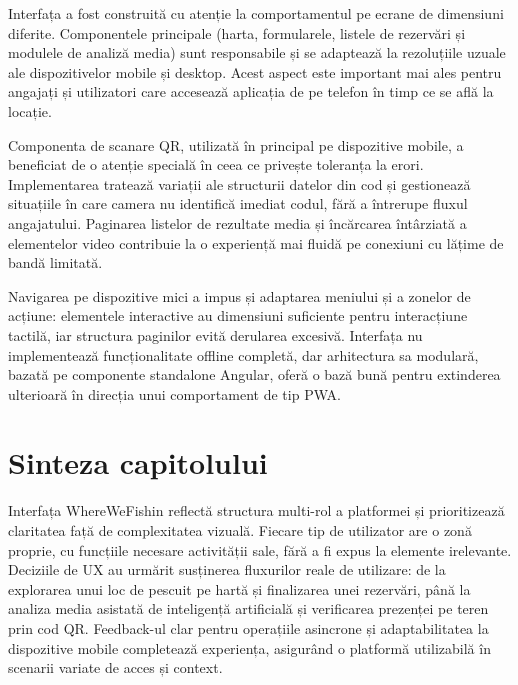 Interfața a fost construită cu atenție la comportamentul pe ecrane de dimensiuni diferite. Componentele principale (harta, formularele, listele de rezervări și modulele de analiză media) sunt responsabile și se adaptează la rezoluțiile uzuale ale dispozitivelor mobile și desktop. Acest aspect este important mai ales pentru angajați și utilizatori care accesează aplicația de pe telefon în timp ce se află la locație.

Componenta de scanare QR, utilizată în principal pe dispozitive mobile, a beneficiat de o atenție specială în ceea ce privește toleranța la erori. Implementarea tratează variații ale structurii datelor din cod și gestionează situațiile în care camera nu identifică imediat codul, fără a întrerupe fluxul angajatului. Paginarea listelor de rezultate media și încărcarea întârziată a elementelor video contribuie la o experiență mai fluidă pe conexiuni cu lățime de bandă limitată.

Navigarea pe dispozitive mici a impus și adaptarea meniului și a zonelor de acțiune: elementele interactive au dimensiuni suficiente pentru interacțiune tactilă, iar structura paginilor evită derularea excesivă. Interfața nu implementează funcționalitate offline completă, dar arhitectura sa modulară, bazată pe componente standalone Angular, oferă o bază bună pentru extinderea ulterioară în direcția unui comportament de tip PWA.

\section{Sinteza capitolului}

Interfața WhereWeFishin reflectă structura multi-rol a platformei și prioritizează claritatea față de complexitatea vizuală. Fiecare tip de utilizator are o zonă proprie, cu funcțiile necesare activității sale, fără a fi expus la elemente irelevante. Deciziile de UX au urmărit susținerea fluxurilor reale de utilizare: de la explorarea unui loc de pescuit pe hartă și finalizarea unei rezervări, până la analiza media asistată de inteligență artificială și verificarea prezenței pe teren prin cod QR. Feedback-ul clar pentru operațiile asincrone și adaptabilitatea la dispozitive mobile completează experiența, asigurând o platformă utilizabilă în scenarii variate de acces și context.
